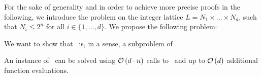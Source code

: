 For the sake of generality and in order to achieve more precise proofs in the following, we introduce the problem on the integer lattice $L = N_1 \times \dots \times N_d$, such that $N_i \leq 2^n$ for all $i \in \{1, \dots, d\}$. We propose the following problem:

We want to show that \Tarskistar\ is, in a sense, a subproblem of \Tarski.
\begin{claim}
    An instance of \Tarski\ can be solved using $\mathcal{O}\left(d\cdot n\right)$ calls to \Tarskistar\ and up to $\mathcal{O}\left(d\right)$ additional function evaluations.
\end{claim}

